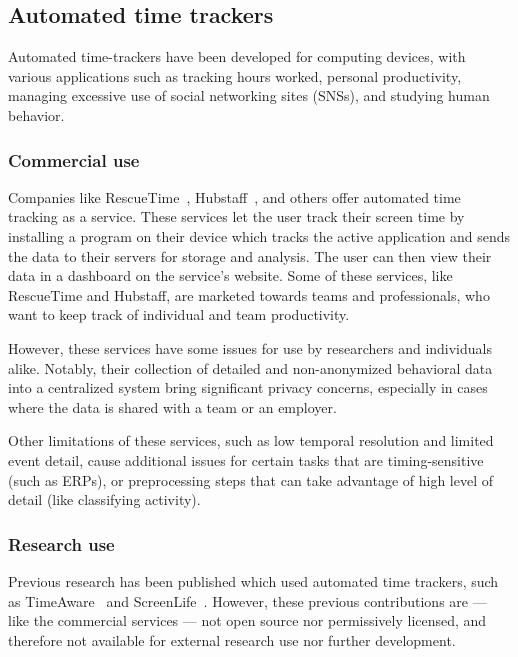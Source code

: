 \documentclass[a4paper]{article}
\begin{document}
\begin{refsection}

\subsection{Automated time trackers}

    Automated time-trackers have been developed for computing devices, with various applications such as tracking hours worked, personal productivity, managing excessive use of social networking sites (SNSs), and studying human behavior.

    \subsubsection{Commercial use}

        Companies like RescueTime~\cite{noauthor_rescuetime_nodate}, Hubstaff~\cite{noauthor_hubstaff_nodate}, and others offer automated time tracking as a service. These services let the user track their screen time by installing a program on their device which tracks the active application and sends the data to their servers for storage and analysis. The user can then view their data in a dashboard on the service's website. Some of these services, like RescueTime and Hubstaff, are marketed towards teams and professionals, who want to keep track of individual and team productivity.

        However, these services have some issues for use by researchers and individuals alike. Notably, their collection of detailed and non-anonymized behavioral data into a centralized system bring significant privacy concerns, especially in cases where the data is shared with a team or an employer.

        Other limitations of these services, such as low temporal resolution and limited event detail, cause additional issues for certain tasks that are timing-sensitive (such as ERPs), or preprocessing steps that can take advantage of high level of detail (like classifying activity).

    \subsubsection{Research use}

        Previous research has been published which used automated time trackers, such as TimeAware~\cite{kim_timeaware_2016} and ScreenLife~\cite{rooksby_personal_2016}. However, these previous contributions are --- like the commercial services --- not open source nor permissively licensed, and therefore not available for external research use nor further development.


\end{refsection}
\end{document}
